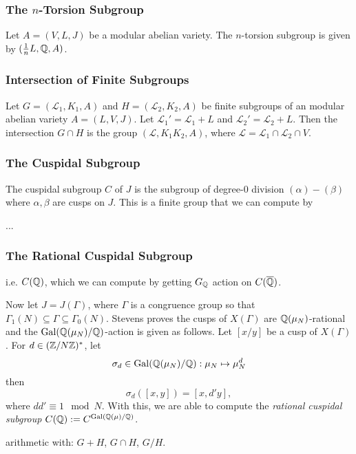 \documentclass{article}
\begin{document}
\subsubsection{The $n$-Torsion Subgroup}

Let $A=(V, L, J)$ be a modular abelian variety. The $n$-torsion subgroup is
given by $(\frac{1}{n} L, \mathbb{Q}, A)$.



\subsubsection{Intersection of Finite Subgroups}

Let $G=(\mathcal{L}_1, K_1, A)$ and $H=(\mathcal{L}_2, K_2, A)$ be finite
subgroups of an modular abelian variety $A=(L, V, J)$. Let $\mathcal{L}_1 ' =
\mathcal{L}_1+L$ and $\mathcal{L}_2 ' = \mathcal{L}_2 + L$. Then the
intersection $G\cap H$ is the group $(\mathcal{L}, K_1K_2, A)$, where
$\mathcal{L}=\mathcal{L}_1\cap \mathcal{L}_2 \cap V$.




\subsubsection{The Cuspidal Subgroup}


The cuspidal subgroup $C$ of $J$ is the subgroup of degree-0 division
$(\alpha)-(\beta)$ where $\alpha,\beta$ are cusps on $J$. This is a finite
group that we can compute by

...


\subsubsection{The Rational Cuspidal Subgroup}
i.e. $C(\mathbb{Q})$,
which we can compute by getting $G_{\mathbb{Q}}$ action on $C(\overline{\mathbb{Q}})$.

Now let $J = J(\Gamma)$, where $\Gamma$ is a congruence group so that
$\Gamma_1(N)\subseteq \Gamma \subseteq \Gamma_0(N)$. Stevens proves the cusps
of $X(\Gamma)$ are $\mathbb{Q}(\mu_N)$-rational and the $\operatorname{Gal}(\mathbb{Q}(\mu_N)/\mathbb{Q})$-action is
given as follows. Let $[x/y]$ be a cusp of $X(\Gamma)$. For $d\in
(\mathbb{Z}/N\mathbb{Z})^*$, let
\[
    \sigma_d\in \operatorname{Gal}(\mathbb{Q}(\mu_N)/\mathbb{Q}):\mu_N\mapsto \mu_N ^d
\]
then
\[
    \sigma_d([x,y])=[x,d'y],
\]
where $dd'\equiv 1 \mod{N}$. With this, we are able to compute the
\emph{rational cuspidal subgroup} $C(\mathbb{Q}):=C^{\operatorname{Gal}(\mathbb{Q}(\mu)/\mathbb{Q})}$.


arithmetic with: $G+H$, $G\cap H$, $G/H$.
\end{document}
